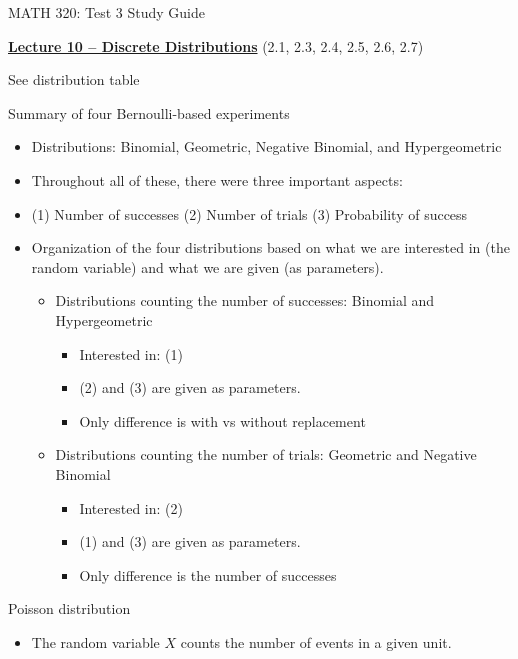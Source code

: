 \documentclass{article}
\newcommand{\bu}[1]{\textbf{\ul{#1}}}				%
\begin{document}
\begin{center}
{\Huge MATH 320: Test 3 Study Guide}

\end{center}

\bigskip\bigskip

{\large \bu{Lecture 10 -- Discrete Distributions}} (2.1, 2.3, 2.4, 2.5, 2.6, 2.7)\bigskip

See distribution table\bigskip

Summary of four Bernoulli-based experiments
\begin{itemize}
    \item Distributions: Binomial, Geometric, Negative Binomial, and Hypergeometric
    \item Throughout all of these, there were three important aspects:
    \item[] (1) Number of successes \hfill (2)  Number of trials \hfill (3) Probability of success
    \item Organization of the four distributions based on what we are interested in (the random variable) and what we are given (as parameters).
    \begin{itemize}
        \item Distributions counting the number of successes: Binomial and Hypergeometric
        \begin{itemize}
            \item Interested in: (1)
            \item (2) and (3) are given as parameters.
            \item Only difference is with vs without replacement
        \end{itemize}
        \item Distributions counting the number of trials: Geometric and Negative Binomial
        \begin{itemize}
            \item Interested in: (2)
            \item (1) and (3) are given as parameters.
            \item Only difference is the number of successes
        \end{itemize}
    \end{itemize}
\end{itemize}\bigskip

Poisson distribution
\begin{itemize}
    \item The random variable $X$ counts the number of events in a given unit.
\end{itemize}
\end{document}
